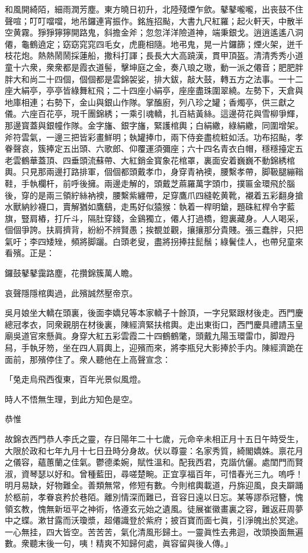 \begin{myquote}
和風開綺陌，細雨潤芳塵。東方曉日初升，北陸殘煙乍歛。鼕鼕嚨嚨，出丧鼓不住聲喧；叮叮噹噹，地吊鑼連宵振作。銘旌招颭，大書九尺紅羅；起火軒天，中散半空黄霧。猙猙獰獰開路鬼，斜擔金斧；忽忽洋洋險道神，端秉銀戈。逍逍遙遙八洞僊，龜鶴遶定；窈窈窕窕四毛女，虎鹿相隨。地弔鬼，晃一片鑼篩；煙火架，迸千枝花炮。熱熱鬧鬧採蓮船，撒科打諢；長長大大高蹺漢，貫甲頂盔。清清秀秀小道童十六衆，衆衆都是霞衣道髻，擊坤庭之金，奏八琅之璈，動一派之僊音；肥肥胖胖大和尚二十四個，個個都是雲錦袈娑，排大鈸，敲大鼓，轉五方之法事。一十二座大絹亭，亭亭皆綠舞紅飛；二十四座小絹亭，座座盡珠圍翠繞。左勢下，天倉與地庫相連；右勢下，金山與銀山作隊。掌醢廚，列八珍之罐；香燭亭，供三獻之儀。六座百花亭，現千團錦綉；一乘引魂轎，扎百結黃絲。這邊荷花與雪柳爭輝，那邊寳蓋與銀幢作隊。金字旛、銀字旛，緊護棺輿；白絹繖，綠絹繖，同圍增架。斧符雲氣，一邊三把皆彩畫鮮明；執罐捧巾，兩下侍妾盡梳粧如活。功布招颭，孝眷聲哀，簇捧定五出頭、六歌郎、仰覆運須彌座；六十四名青衣白帽，穩穩擡定五老雲鶴華蓋頂、四垂頭流蘇帶、大紅銷金寳象花棺罩，裏面安着巍巍不動錦綉棺輿。只見那兩邊打路排軍，個個都頭戴孝巾，身穿青衲襖，腰繫孝帶，脚靸腿繃䩺鞋，手執欄杆，前呼後擁。兩邊走解的，頭戴芝蔴羅萬字頭巾，撲匾金環飛於腦後，穿的是兩三領紵絲衲襖，腰繫紫纏帶，足穿鷹爪四縫乾黄靴，襯着五彩翻身搶水獸納紗襪口，賣解猶如鷹鷂，走馬好似猿猴：執着一桿明鎗，題硃紅桿令字藍旗，豎肩樁，打斤斗，隔肚穿錢，金鷄獨立，僊人打過橋，鐙裏藏身。人人喝采，個個爭誇。扶肩擠背，紛紛不辨賢愚；挨覩並觀，攘攘那分貴賤。張三蠢胖，只把氣吁；李四矮矬，頻將脚躧。白頭老叟，盡將拐捧拄髭鬚；綠鬢佳人，也帶兒童來看殯。正是：

鑼鼓鼕鼕靄路塵，花攢錦簇萬人瞻。

哀聲隱隱棺輿過，此殯誠然壓帝京。
\end{myquote}

吳月娘坐大轎在頭裏，後面李嬌兒等本家轎子十餘頂，一字兒緊跟材後走。西門慶總冠孝衣，同衆親朋在材後裏，陳經濟緊扶棺輿。走出東街口，西門慶具禮請玉皇廟吳道官來懸眞。身穿大紅五彩雲霞二十四鶴鶴氅，頭戴九陽玉環雷巾，脚蹬丹舄，手執牙笏，坐在四人肩輿上，迎殯而來，將李瓶兒大影捧於手内。陳經濟跪在面前，那殯停住了。衆人聽他在上高聲宣念：

\begin{myquote}
「兔走烏飛西復東，百年光景似風燈。

時人不悟無生理，到此方知色是空。

恭惟

故錦衣西門恭人李氏之靈，存日陽年二十七歲，元命辛未相正月十五日午時受生，大限於政和七年九月十七日丑時分身故。伏以尊靈：名家秀質，綺閣嬌姝。禀花月之儀容，蘊蕙蘭之佳氣。鬱德柔婉，賦性溫和。配我西君，克諧伉儷。處閨門而賢淑，資琴瑟以好和。曾種藍田，尋嗟楚畹。正宜享福百年，可惜春光三九。嗚呼！明月易缺，好物難全。善類無常，修短有數。今則棺輿載道，丹旆迎風，良夫躃踊於柩前，孝眷哀矜於巷陌。離別情深而難已，音容日遠以日忘。某等謬忝冠簪，愧領玄教，愧無新垣平之神術，恪遵玄元始之遺風。徒展崔徽畫裏之容，難返莊周夢中之蝶。漱甘露而沃瓊漿，超僊識登於紫府；披百寶而面七眞，引淨魄出於冥途。一心無挂，四大皆空。苦苦苦，氣化清風形歸土。一靈眞性去弗迴，改頭換面無遍數。衆聽末後一句，咦！精爽不知歸何處，眞容留與後人傳。」
\end{myquote}

